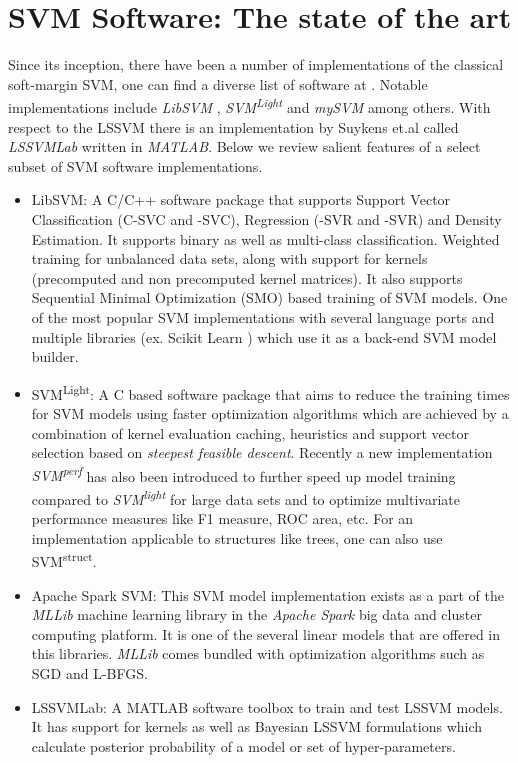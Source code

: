 \section{SVM Software: The state of the art}

Since its inception, there have been a number of implementations of the classical soft-margin SVM, one can find a diverse list of software at \cite{SVMSoft}. Notable implementations include \textit{LibSVM} \cite{LibSVM}, \textit{SVM\textsuperscript{Light}} \cite{SVMLight} and \textit{mySVM} \cite{mySVM} among others. With respect to the LSSVM there is an implementation by Suykens et.al \cite{LSSVMLab} called \textit{LSSVMLab} written in \textit{MATLAB}. Below we review salient features of a select subset of SVM software implementations.

\begin{itemize}
\item LibSVM: A C/C++ software package that supports Support Vector Classification (C-SVC and \textnu-SVC),  Regression (\textepsilon-SVR and \textnu-SVR) and Density Estimation. It supports binary as well as multi-class classification. Weighted training for unbalanced data sets, along with support for kernels (precomputed and non precomputed kernel matrices). It also supports Sequential Minimal Optimization (SMO) based training of SVM models. One of the most popular SVM implementations with several language ports and multiple libraries (ex. Scikit Learn \cite{scikit-learn}) which use it as a back-end SVM model builder. 

\item SVM\textsuperscript{Light}: A C based software package that aims to reduce the training times for SVM models using faster optimization algorithms which are achieved by a combination of kernel evaluation caching, heuristics and support vector selection based on \textit{steepest feasible descent}. Recently a new implementation \textit{SVM\textsuperscript{perf}} has also been introduced to further speed up model training compared to \textit{SVM\textsuperscript{light}} for large data sets and to optimize multivariate performance measures like F1 measure, ROC area, etc. For an implementation applicable to structures like trees, one can also use SVM\textsuperscript{struct}. 

\item Apache Spark SVM: This SVM model implementation exists as a part of the \textit{MLLib} machine learning library in the \textit{Apache Spark} big data and cluster computing platform. It is one of the several linear models that are offered in this libraries. \textit{MLLib} comes bundled with optimization algorithms such as SGD and L-BFGS.


\item LSSVMLab: A MATLAB software toolbox to train and test LSSVM models. It has support for kernels as well as Bayesian LSSVM formulations which calculate posterior probability of a model or set of hyper-parameters.

\end{itemize}

